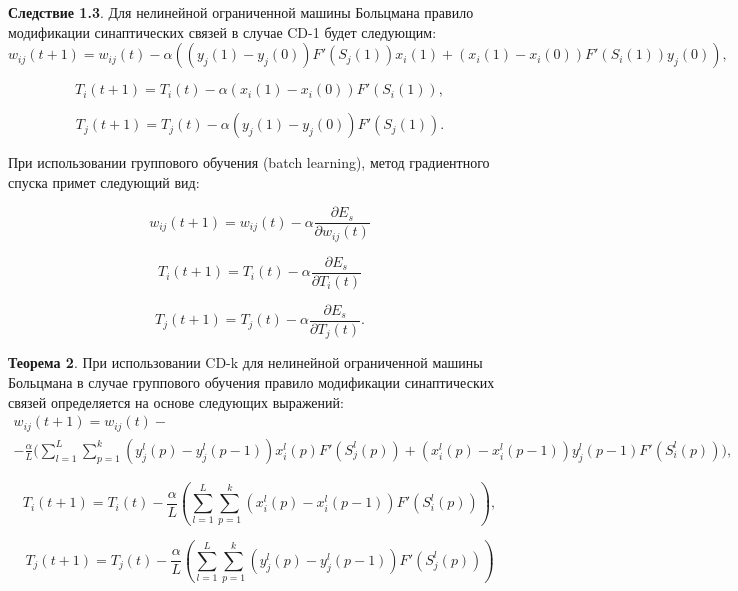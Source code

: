 \textbf{Следствие 1.3}. Для нелинейной ограниченной машины Больцмана правило модификации синаптических связей в случае CD-1 будет следующим:	
\begin{equation*}
    w_{ij}(t+1)=w_{ij}(t)-\alpha((y_j(1)-y_j(0))F'(S_j(1))x_i(1)+(x_i(1)-x_i(0))F'(S_i(1))y_j(0)),
\end{equation*}

\begin{equation*}
    T_i(t+1)=T_i(t)-\alpha(x_i(1)-x_i(0))F'(S_i(1)),
\end{equation*}

\begin{equation*}
    T_j(t+1)=T_j(t)-\alpha(y_j(1)-y_j(0))F'(S_j(1)).  
\end{equation*}

При использовании группового обучения (batch learning), метод градиентного спуска примет следующий вид:

\begin{equation}
    w_{ij}(t+1)=w_{ij}(t)-\alpha\frac{\partial E_s}{\partial w_{ij}(t)}
\end{equation}

\begin{equation}
    T_{i}(t+1)=T_{i}(t)-\alpha\frac{\partial E_s}{\partial T_{i}(t)}
\end{equation}

\begin{equation}
    T_{j}(t+1)=T_{j}(t)-\alpha\frac{\partial E_s}{\partial T_{j}(t)}.
\end{equation}

\textbf{Теорема 2}. При использовании  CD-k для нелинейной ограниченной машины Больцмана в случае группового обучения правило модификации синаптических связей определяется на основе следующих выражений:
\begin{multline*}
    w_{ij}(t+1)=w_{ij}(t)-\\-\frac{\alpha}{L}\Bigg(\sum_{l=1}^L\sum_{p=1}^k (y_j^l(p)-y_j^l(p-1))x_i^l(p)F'(S_j^l(p))+(x_i^l(p)-x_i^l(p-1))y_j^l(p-1)F'(S_i^l(p))\Bigg),
\end{multline*}

\begin{equation*}
    T_{i}(t+1)=T_{i}(t)-\frac{\alpha}{L}\left(\sum_{l=1}^L\sum_{p=1}^k (x_i^l(p)-x_i^l(p-1))F'(S_i^l(p))\right),
\end{equation*}

\begin{equation*}
    T_{j}(t+1)=T_{j}(t)-\frac{\alpha}{L}\left(\sum_{l=1}^L\sum_{p=1}^k (y_j^l(p)-y_j^l(p-1))F'(S_j^l(p))\right)
\end{equation*}

